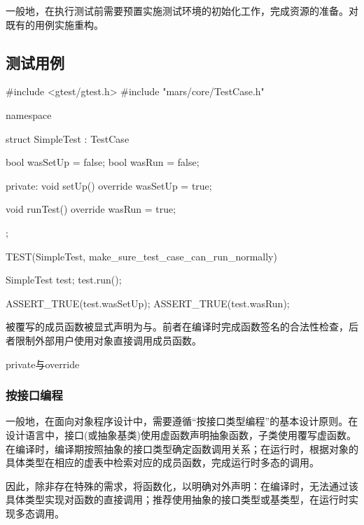 \begin{content}

一般地，在执行测试前需要预置实施测试环境的初始化工作，完成资源的准备。对既有的用例实施重构。

\subsection{测试用例}

\begin{leftbar}
 \begin{c++}[caption={\ttfamily{test/mars/core/TestCaseSpec.cc}}]
#include <gtest/gtest.h>
#include "mars/core/TestCase.h"

namespace {
  struct SimpleTest : TestCase {
    bool wasSetUp = false;
    bool wasRun = false;

  private:
    void setUp() override {
      wasSetUp = true;
    }

    void runTest() override {
      wasRun = true;
    }
  };
}

TEST(SimpleTest, make_sure_test_case_can_run_normally) {
  SimpleTest test;
  test.run();

  ASSERT_TRUE(test.wasSetUp);
  ASSERT_TRUE(test.wasRun);
}
 \end{c++}
\end{leftbar}

被覆写的成员函数被显式声明为与。前者在编译时完成函数签名的合法性检查，后者限制外部用户使用对象直接调用成员函数。

\begin{episode}{private与override}
\begin{content}

\subsubsection{按接口编程}

一般地，在面向对象程序设计中，需要遵循“按接口类型编程”的基本设计原则。在设计语言中，接口(或抽象基类)使用虚函数声明抽象函数，子类使用覆写虚函数。在编译时，编译期按照抽象的接口类型确定函数调用关系；在运行时，根据对象的具体类型在相应的虚表中检索对应的成员函数，完成运行时多态的调用。

因此，除非存在特殊的需求，将函数化，以明确对外声明：在编译时，无法通过该具体类型实现对函数的直接调用；推荐使用抽象的接口类型或基类型，在运行时实现多态调用。


\end{content}
\end{episode}
\end{content}
